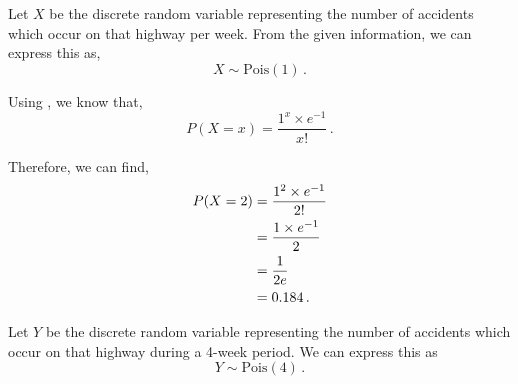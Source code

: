 %
%

\begin{subquestions}
	

\subquestion

Let $X$ be the discrete random variable representing the number of accidents which occur on that highway per week. From the given information, we can express this as,
\begin{equation}
	X \sim \text{Pois}(1) \,.
\end{equation}

\begin{subsubquestions}
	
\subsubquestion

Using , we know that,
\begin{equation}
	P(X=x)= \frac{1^x \times e^{-1}}{x!} \,.
\end{equation}
	
Therefore, we can find,
\begin{align}
	P(X=2) & = \frac{1^2 \times e^{-1}}{2!} \nonumber \\
	       & = \frac{1 \times e^{-1}}{2} \nonumber \\
	       & = \frac{1}{2e} \nonumber \\
	       & = 0.184 \,.
\end{align}
	

\subsubquestion

Let $Y$ be the discrete random variable representing the number of accidents which occur on that highway during a 4-week period. We can express this as 
\begin{equation}
	Y \sim \text{Pois}(4) \,.
\end{equation}


\end{subsubquestions}
\end{subquestions}
